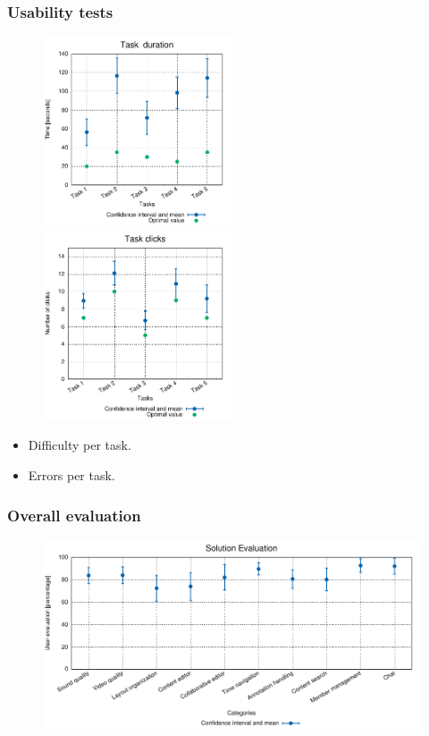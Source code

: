 \documentclass[compress]{beamer}
\begin{document}
	\begin{frame}[c]
		\frametitle{Usability tests}
		\begin{figure}[H]
			\includegraphics[width=0.5\textwidth]{figures/user_times.pdf}
			\includegraphics[width=0.5\textwidth]{figures/user_clicks.pdf}
		\end{figure}
		\begin{itemize}
			\item Difficulty per task.
			\item Errors per task.
		\end{itemize}
	\end{frame}
	\begin{frame}[c]
		\frametitle{Overall evaluation}
		\begin{figure}[H]
			\includegraphics[width=\textwidth]{figures/user_evals.pdf}
		\end{figure}
	\end{frame}
\end{document}
